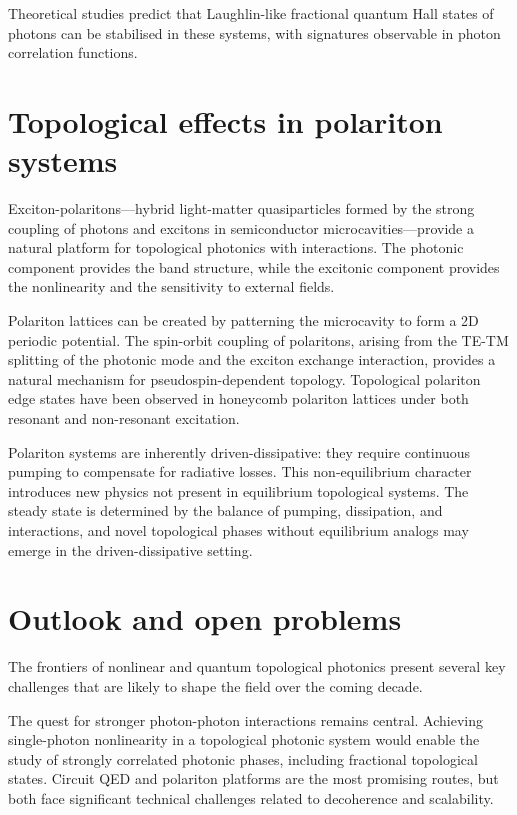 Theoretical studies predict that Laughlin-like fractional quantum Hall
states of photons can be stabilised in these systems, with
signatures observable in photon correlation functions.

\section{Topological effects in polariton systems}
\label{sec:ch18-polaritons}

Exciton-polaritons---hybrid light-matter quasiparticles formed by the
strong coupling of photons and excitons in semiconductor
microcavities---provide a natural platform for topological photonics
with interactions.  The photonic component provides the band structure,
while the excitonic component provides the nonlinearity and the
sensitivity to external fields.

Polariton lattices can be created by patterning the microcavity to form
a 2D periodic potential.  The spin-orbit coupling of polaritons, arising
from the TE-TM splitting of the photonic mode and the exciton exchange
interaction, provides a natural mechanism for pseudospin-dependent
topology.  Topological polariton edge states have been observed in
honeycomb polariton lattices under both resonant and non-resonant
excitation.

Polariton systems are inherently driven-dissipative: they require
continuous pumping to compensate for radiative losses.  This
non-equilibrium character introduces new physics not present in
equilibrium topological systems.  The steady state is determined by the
balance of pumping, dissipation, and interactions, and novel
topological phases without equilibrium analogs may emerge in the
driven-dissipative setting.

\section{Outlook and open problems}
\label{sec:ch18-outlook}

The frontiers of nonlinear and quantum topological photonics present
several key challenges that are likely to shape the field over the
coming decade.

The quest for stronger photon-photon interactions remains central.
Achieving single-photon nonlinearity in a topological photonic system
would enable the study of strongly correlated photonic phases, including
fractional topological states.  Circuit QED and polariton platforms are
the most promising routes, but both face significant technical
challenges related to decoherence and scalability.

